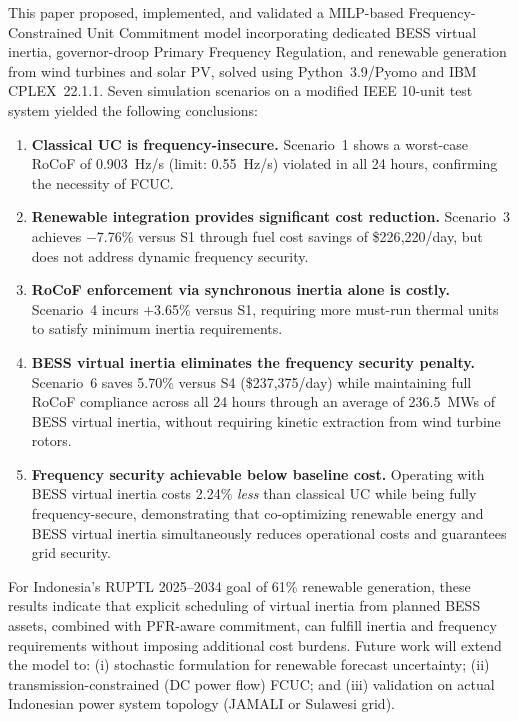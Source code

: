 \documentclass[journal]{IEEEtran}
\begin{document}
This paper proposed, implemented, and validated a MILP-based
Frequency-Constrained Unit Commitment model incorporating
dedicated BESS virtual inertia, governor-droop Primary Frequency
Regulation, and renewable generation from wind turbines and solar PV,
solved using Python~3.9/Pyomo and IBM CPLEX~22.1.1.
Seven simulation scenarios on a modified IEEE 10-unit test system
yielded the following conclusions:

\begin{enumerate}
  \item \textbf{Classical UC is frequency-insecure.} Scenario~1
    shows a worst-case RoCoF of 0.903~Hz/s (limit: 0.55~Hz/s)
    violated in all 24 hours, confirming the necessity of FCUC.

  \item \textbf{Renewable integration provides significant cost reduction.}
    Scenario~3 achieves $-$7.76\% versus S1 through fuel cost savings
    of \$226{,}220/day, but does not address dynamic frequency security.

  \item \textbf{RoCoF enforcement via synchronous inertia alone is costly.}
    Scenario~4 incurs $+$3.65\% versus S1, requiring more must-run
    thermal units to satisfy minimum inertia requirements.

  \item \textbf{BESS virtual inertia eliminates the frequency security penalty.}
    Scenario~6 saves 5.70\% versus S4 (\$237{,}375/day) while
    maintaining full RoCoF compliance across all 24 hours through an
    average of 236.5~MWs of BESS virtual inertia, without requiring
    kinetic extraction from wind turbine rotors.

  \item \textbf{Frequency security achievable below baseline cost.}
    Operating with BESS virtual inertia costs 2.24\% \emph{less} than
    classical UC while being fully frequency-secure, demonstrating that
    co-optimizing renewable energy and BESS virtual inertia simultaneously
    reduces operational costs and guarantees grid security.
\end{enumerate}

For Indonesia's RUPTL 2025--2034 goal of 61\% renewable generation,
these results indicate that explicit scheduling of virtual inertia
from planned BESS assets, combined with PFR-aware commitment, can fulfill
inertia and frequency requirements without imposing additional cost burdens.
Future work will extend the model to: (i) stochastic formulation
for renewable forecast uncertainty; (ii) transmission-constrained
(DC power flow) FCUC; and (iii) validation on actual Indonesian
power system topology (JAMALI or Sulawesi grid).
\end{document}
